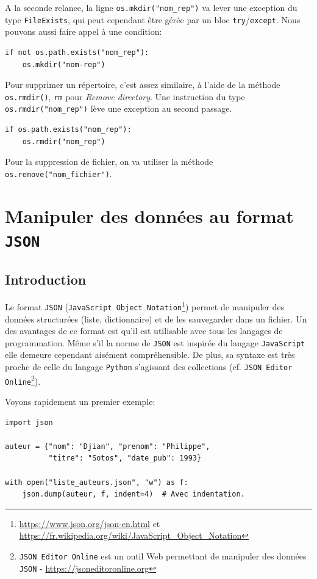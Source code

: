 \documentclass[a4paper,12pt]{book}
\begin{document}
A la seconde relance, la ligne \verb|os.mkdir("nom_rep")| va lever une exception du type \texttt{FileExists}, qui peut cependant être gérée par un bloc \texttt{try}/\texttt{except}. Nous pouvons aussi faire appel à une condition:
\begin{lstlisting}
if not os.path.exists("nom_rep"):
    os.mkdir("nom-rep")
\end{lstlisting}
\medskip

Pour supprimer un répertoire, c'est assez similaire, à l'aide de la méthode \texttt{os.rmdir()}, \texttt{rm} pour \textit{Remove directory}. Une instruction du type \verb|os.rmdir("nom_rep")| lève une exception  au second passage.
\begin{lstlisting}
if os.path.exists("nom_rep"):
    os.rmdir("nom_rep")
\end{lstlisting}
\medskip

Pour la suppression de fichier, on va utiliser la méthode \verb|os.remove("nom_fichier")|.
\medskip

\chapter{Manipuler des données au format \texttt{JSON}}
\section{Introduction}
Le format \texttt{JSON} (\texttt{JavaScript Object Notation}\footnote{\url{https://www.json.org/json-en.html} et \url{https://fr.wikipedia.org/wiki/JavaScript_Object_Notation}}) permet de manipuler des données structurées (liste, dictionnaire) et de les sauvegarder dans un fichier. Un des avantages de ce format est qu'il est utilisable avec tous les langages de programmation. Même s'il la norme de \texttt{JSON} est inspirée du langage \texttt{JavaScript} elle demeure cependant aisément compréhensible. De plus, sa syntaxe est très proche de celle du langage \texttt{Python} s'agissant des collections (cf. \texttt{JSON Editor Online}\footnote{\texttt{JSON Editor Online} est un outil Web permettant de manipuler des données \texttt{JSON} - \url{https://jsoneditoronline.org}}).
\medskip

Voyons rapidement un premier exemple:
\begin{lstlisting}[caption=Créer un fichier \texttt{.json}]
import json

auteur = {"nom": "Djian", "prenom": "Philippe",
          "titre": "Sotos", "date_pub": 1993}

with open("liste_auteurs.json", "w") as f:
    json.dump(auteur, f, indent=4)  # Avec indentation.
\end{lstlisting}\label{serialistionJSON}
\medskip
\end{document}
